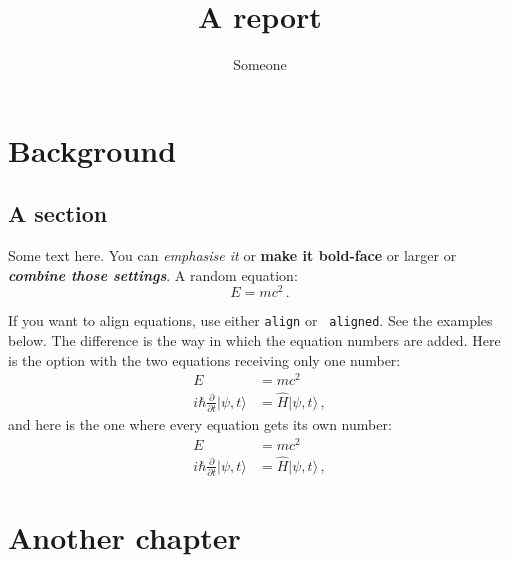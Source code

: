 \documentclass[11pt]{report}
\begin{document}

\title{A report}
\author{Someone}
\maketitle


\tableofcontents



\chapter{Background}
  \section{A section}
    

    Some text here. You can \emph{emphasise it} or {\bfseries make it
      bold-face} or {\large larger} or \emph{\bfseries\large combine those
      settings}. A random equation:
    \begin{equation}
    \label{e:Einstein1}
    E=mc^2 \,.
    \end{equation}
    
    If you want to align equations, use either {\tt align} or {\tt
      aligned}. See the examples below. The difference is the way in which
    the equation numbers are added. Here is the option with the two
    equations receiving only one number:
    \begin{equation}
    \label{e:Einstein2}
    \begin{aligned}
    E &= mc^2  \\
    i\hbar \frac{\partial}{\partial t} |\psi, t\rangle 
      &= \hat{H} |\psi,t\rangle\,,
    \end{aligned}
    \end{equation}
    and here is the one where every equation gets its own number:
    \begin{align}
    \label{e:Einstein3}
    E &= mc^2  \\
    \label{e:Schroedinger}
    i\hbar \frac{\partial}{\partial t} |\psi, t\rangle 
      &= \hat{H} |\psi,t\rangle\,,
    \end{align}




\chapter{Another chapter}
\end{document}
